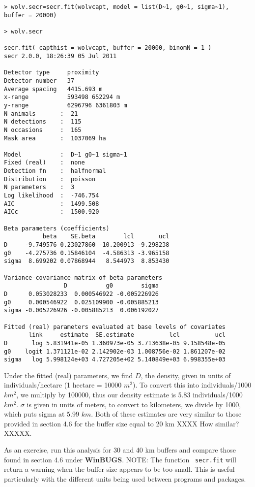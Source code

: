 {\small
\begin{verbatim}
> wolv.secr=secr.fit(wolvcapt, model = list(D~1, g0~1, sigma~1), buffer = 20000)

> wolv.secr

secr.fit( capthist = wolvcapt, buffer = 20000, binomN = 1 )
secr 2.0.0, 18:26:39 05 Jul 2011

Detector type     proximity 
Detector number   37 
Average spacing   4415.693 m 
x-range           593498 652294 m 
y-range           6296796 6361803 m 
N animals       :  21  
N detections    :  115 
N occasions     :  165 
Mask area       :  1037069 ha 

Model           :  D~1 g0~1 sigma~1 
Fixed (real)    :  none 
Detection fn    :  halfnormal 
Distribution    :  poisson 
N parameters    :  3 
Log likelihood  :  -746.754 
AIC             :  1499.508 
AICc            :  1500.920 

Beta parameters (coefficients) 
           beta    SE.beta        lcl       ucl
D     -9.749576 0.23027860 -10.200913 -9.298238
g0    -4.275736 0.15846104  -4.586313 -3.965158
sigma  8.699202 0.07868944   8.544973  8.853430

Variance-covariance matrix of beta parameters 
                 D           g0        sigma
D      0.053028233  0.000546922 -0.005226926
g0     0.000546922  0.025109900 -0.005885213
sigma -0.005226926 -0.005885213  0.006192027

Fitted (real) parameters evaluated at base levels of covariates 
       link     estimate  SE.estimate          lcl          ucl
D       log 5.831941e-05 1.360973e-05 3.713638e-05 9.158548e-05
g0    logit 1.371121e-02 2.142902e-03 1.008756e-02 1.861207e-02
sigma   log 5.998124e+03 4.727205e+02 5.140849e+03 6.998355e+03
\end{verbatim}
}

Under the fitted (real) parameters, we find $D$, the density, given in
units of individuals/hectare (1 hectare = 10000 $m^2$).  To convert this
into individuals/1000 $km^2$, we multiply by 100000, thus our density
estimate is 5.83 individuals/1000 $km^2$.  $\sigma$ is given in units of
meters, to convert to kilometers, we divide by 1000, which puts sigma
at 5.99 $km$.  Both of these estimates are very similar to those
provided in section 4.6 for the buffer size equal to 20 km XXXX How
similar? XXXXX.  

As an
exercise, run this analysis for 30 and 40 km buffers and compare those
found in section 4.6 under {\bf WinBUGS}.  NOTE: The function \mbox{\tt
  secr.fit} 
will return a
warning when the buffer size appears to be too small.  This is useful
particularly with the different units being used between programs and
packages.


